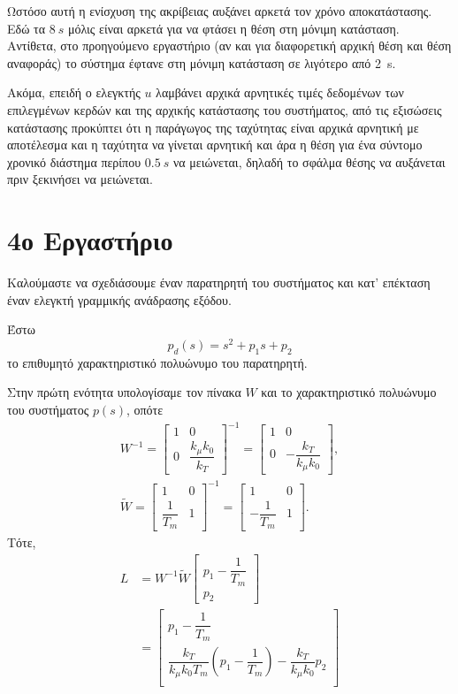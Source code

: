\documentclass[12pt]{article}
\begin{document}
Ωστόσο αυτή η ενίσχυση της ακρίβειας αυξάνει αρκετά τον χρόνο αποκατάστασης. Εδώ τα \(\SI{8 }{s }\) μόλις είναι αρκετά για να φτάσει η θέση στη μόνιμη κατάσταση. Αντίθετα, στο προηγούμενο εργαστήριο (αν και για διαφορετική  αρχική θέση και θέση αναφοράς) το σύστημα έφτανε στη μόνιμη κατάσταση σε λιγότερο από \SI{2}{s}. 

Ακόμα, επειδή ο ελεγκτής \(u\) λαμβάνει αρχικά αρνητικές τιμές δεδομένων των επιλεγμένων κερδών και της αρχικής κατάστασης του συστήματος, από τις εξισώσεις κατάστασης προκύπτει ότι η παράγωγος της ταχύτητας είναι αρχικά αρνητική με αποτέλεσμα και η ταχύτητα να γίνεται αρνητική και άρα η θέση για ένα σύντομο χρονικό διάστημα περίπου \(\SI{0.5}{s }\) να μειώνεται, δηλαδή το σφάλμα θέσης να αυξάνεται πριν ξεκινήσει να μειώνεται.

\section*{4ο Εργαστήριο}
Καλούμαστε να σχεδιάσουμε έναν παρατηρητή του συστήματος και κατ' επέκταση έναν ελεγκτή γραμμικής ανάδρασης εξόδου.

Έστω  
\begin{equation*}
    p_d(s) = s^2 + p_1 s + p_2 
\end{equation*}
το επιθυμητό χαρακτηριστικό πολυώνυμο του παρατηρητή.

Στην πρώτη ενότητα υπολογίσαμε τον πίνακα \(W\) και το χαρακτηριστικό πολυώνυμο του συστήματος \(p(s)\), οπότε
\begin{gather*}
    W^{-1} =  \begin{bmatrix}
        1 & 0 \\
        0 & \dfrac{k_\mu k_0}{k_T}
    \end{bmatrix}^{-1} = 
    \begin{bmatrix}
        1 & 0 \\
        0 & -\dfrac{k_T}{k_\mu k_0} 
    \end{bmatrix}, \\
    \tilde{W} = \begin{bmatrix}
        1 & 0 \\
        \dfrac{1}{T_m } & 1
    \end{bmatrix}^{-1} = \begin{bmatrix}
        1 & 0 \\
        -\dfrac{1}{T_m } & 1
    \end{bmatrix}. 
\end{gather*}
Τότε, 
\begin{align*}
    L &= W^{-1} \tilde{W} \begin{bmatrix}
        p_1 - \dfrac{1}{T_m } \\ 
        p_2 
    \end{bmatrix} \\
    &= \begin{bmatrix}
        p_1 - \dfrac{1}{T_m } \\ 
        \dfrac{k_T }{k_\mu k_0 T_m }\left( p_1 - \dfrac{1}{T_m }\right) - \dfrac{k_T }{k_\mu k_0} p_2\\ 
    \end{bmatrix}
\end{align*}
\end{document}
